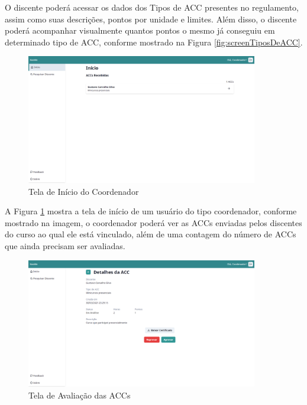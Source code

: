 O discente poderá acessar os dados dos Tipos de ACC presentes no regulamento, assim como suas descrições, pontos por unidade e limites. Além disso, o discente poderá acompanhar visualmente quantos pontos o mesmo já conseguiu em determinado tipo de ACC, conforme mostrado na Figura \ref{fig:screenTiposDeACC}.

\begin{figure}[H]
    \centering
    \includegraphics[width=0.9\textwidth]{dados/figuras/Proposta/Screens/coordinator_received_accs.png}
    \caption{Tela de Início do Coordenador}
    \label{fig:screenACCsRecebidas}
\end{figure}

A Figura \ref{fig:screenACCsRecebidas} mostra a tela de início de um usuário do tipo coordenador, conforme mostrado na imagem, o coordenador poderá ver as ACCs enviadas pelos discentes do curso ao qual ele está vinculado, além de uma contagem do número de ACCs que ainda precisam ser avaliadas.

\begin{figure}[H]
    \centering
    \includegraphics[width=0.9\textwidth]{dados/figuras/Proposta/Screens/evaluate_acc.png}
    \caption{Tela de Avaliação das ACCs}
    \label{fig:screenAvaliarACC}
\end{figure}

